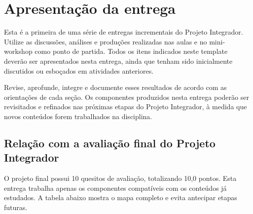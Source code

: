\section*{Apresentação da entrega}
Esta é a primeira de uma série de entregas incrementais do Projeto Integrador. Utilize as discussões, análises e produções realizadas nas aulas e no mini-workshop como ponto de partida. Todos os itens indicados neste template deverão ser apresentados nesta entrega, ainda que tenham sido inicialmente discutidos ou esboçados em atividades anteriores.

Revise, aprofunde, integre e documente esses resultados de acordo com as orientações de cada seção. Os componentes produzidos nesta entrega poderão ser revisitados e refinados nas próximas etapas do Projeto Integrador, à medida que novos conteúdos forem trabalhados na disciplina.

\subsection*{Relação com a avaliação final do Projeto Integrador}
O projeto final possui 10 quesitos de avaliação, totalizando 10,0 pontos. Esta entrega trabalha apenas os componentes compatíveis com os conteúdos já estudados. A tabela abaixo mostra o mapa completo e evita antecipar etapas futuras.


